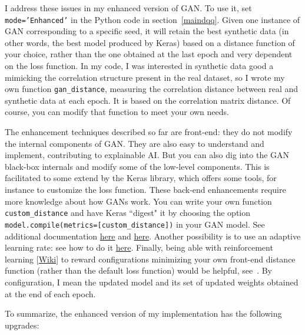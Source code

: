 \documentclass[oneside,10pt]{book}
\begin{document}
I address these issues in my enhanced version of GAN. To use it, set \texttt{mode='Enhanced'} in the Python code
 in section~\ref{maindqq}. Given one instance of GAN corresponding to a specific seed, it will retain the best synthetic data (in other words, the best model produced by Keras) based on
 a distance function of your choice, rather than the one obtained at the last epoch and very dependent on the loss function. In my code, I was interested in synthetic data good a mimicking the correlation structure present in the real dataset, so I wrote my own function
\texttt{gan\_distance}, measuring the correlation distance between real and synthetic data at each epoch. It is based on
 the \textcolor{index}{correlation matrix distance}. Of course, you can modify that function to meet your own needs.

The enhancement techniques described so far are front-end: they do not modify the internal components of GAN. They are also easy to understand and implement, contributing to  
 explainable AI. But you can also dig into the GAN black-box internals and modify some of the low-level components. This is facilitated to some extend by the Keras library, which offers some tools, for instance to customize the loss function. These back-end enhancements require more knowledge about how GANs work. You can write your own
 function \texttt{custom\_distance} and have Keras ``digest" it by choosing the 
 option \texttt{model.compile(metrics=[custom\_distance])} in your GAN model. See additional documentation 
 \href{https://www.tensorflow.org/guide/keras/save_and_serialize}{here} and 
\href{https://datascience.stackexchange.com/questions/116811/define-a-custom-distance-between-classes-in-keras}{here}. 
Another possibility is to use an adaptive \textcolor{index}{learning rate}: see how to do it \href{https://towardsdatascience.com/learning-rate-schedule-in-practice-an-example-with-keras-and-tensorflow-2-0-2f48b2888a0c}{here}.
Finally, being able  with 
\textcolor{index}{reinforcement learning} [\href{https://en.wikipedia.org/wiki/Reinforcement_learning}{Wiki}] to reward configurations minimizing your own front-end distance function (rather than the 
 default loss function) would be helpful, see~\cite{reinflr21}. By configuration, I mean the updated model and its set of 
updated weights obtained at the end of each epoch.


\noindent To summarize, the enhanced version of my implementation has the following upgrades: \vspace{1ex}
\end{document}
